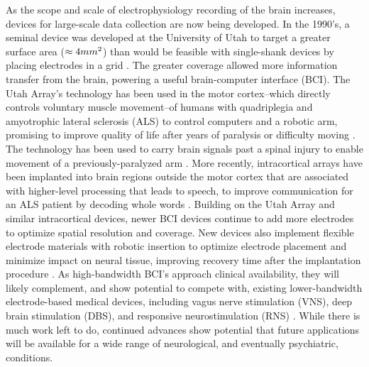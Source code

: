 \documentclass[11pt]{article}
\begin{document}
As the scope and scale of electrophysiology recording of the brain increases, devices for large-scale data collection are now being developed. In the 1990's, a seminal device was developed at the University of Utah to target a greater surface area ($\approx4mm\textsuperscript{2}$) than would be feasible with single-shank devices by placing electrodes in a grid \cite{maynard1997utaharray}. The greater coverage allowed more information transfer from the brain, powering a useful brain-computer interface (BCI). The Utah Array's technology has been used in the motor cortex--which directly controls voluntary muscle movement--of humans with quadriplegia and amyotrophic lateral sclerosis (ALS) to control computers and a robotic arm, promising to improve quality of life after years of paralysis or difficulty moving \cite{kim2008braingate, simeral2011braingate, hochberg2012reach, bacher2015bg}. The technology has been used to carry brain signals past a spinal injury to enable movement of a previously-paralyzed arm \cite{ajiboye2017bciarm}. More recently, intracortical arrays have been implanted into brain regions outside the motor cortex that are associated with higher-level processing that leads to speech, to improve communication for an ALS patient by decoding whole words \cite{card2024neuroprosthesis}. Building on the Utah Array and similar intracortical devices, newer BCI devices continue to add more electrodes to optimize spatial resolution and coverage. New devices also implement flexible electrode materials with robotic insertion to optimize electrode placement and minimize impact on neural tissue, improving recovery time after the implantation procedure \cite{musk2019integrated}. As high-bandwidth BCI's approach clinical availability, they will likely complement, and show potential to compete with, existing lower-bandwidth electrode-based medical devices, including vagus nerve stimulation (VNS), deep brain stimulation (DBS), and responsive neurostimulation (RNS) \cite{pertsch2025neuromod, heck2014rns, geller2018rns}. While there is much work left to do, continued advances show potential that future applications will be available for a wide range of neurological, and eventually psychiatric, conditions. %
\end{document}
